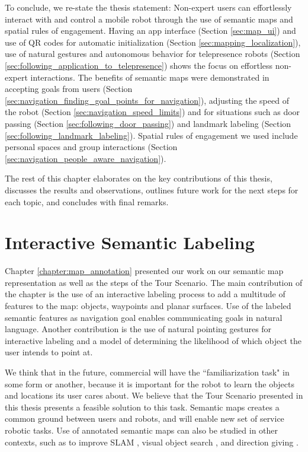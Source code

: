 \documentclass[12pt]{gatech-thesis}
\begin{document}
To conclude, we re-state the thesis statement: Non-expert users can effortlessly interact with and control a mobile robot through the use of semantic maps and spatial rules of engagement. Having an app interface (Section \ref{sec:map_ui}) and use of QR codes for automatic initialization (Section \ref{sec:mapping_localization}), use of natural gestures and autonomous behavior for telepresence robots (Section \ref{sec:following_application_to_telepresence}) shows the focus on effortless non-expert interactions. The benefits of semantic maps were demonstrated in accepting goals from users (Section \ref{sec:navigation_finding_goal_points_for_navigation}), adjusting the speed of the robot (Section \ref{sec:navigation_speed_limits}) and for situations such as door passing (Section \ref{sec:following_door_passing}) and landmark labeling (Section \ref{sec:following_landmark_labeling}). Spatial rules of engagement we used include personal spaces and group interactions (Section \ref{sec:navigation_people_aware_navigation}).

The rest of this chapter elaborates on the key contributions of this thesis, discusses the results and observations, outlines future work for the next steps for each topic, and concludes with final remarks.

\section{Interactive Semantic Labeling}

Chapter \ref{chapter:map_annotation} presented our work on our semantic map representation as well as the steps of the Tour Scenario. The main contribution of the chapter is the use of an interactive labeling process to add a multitude of features to the map: objects, waypoints and planar surfaces. Use of the labeled semantic features as navigation goal enables communicating goals in natural language. Another contribution is the use of natural pointing gestures for interactive labeling and a model of determining the likelihood of which object the user intends to point at.

We think that in the future, commercial will have the ``familiarization task" in some form or another, because it is important for the robot to learn the objects and locations its user cares about. We believe that the Tour Scenario presented in this thesis presents a feasible solution to this task. Semantic maps creates a common ground between users and robots, and will enable new set of service robotic tasks. Use of annotated semantic maps can also be studied in other contexts, such as to improve SLAM \cite{trevor2015semantic}, visual object search \cite{rogers2013life},  and direction giving \cite{kollar2010toward}.
\end{document}

